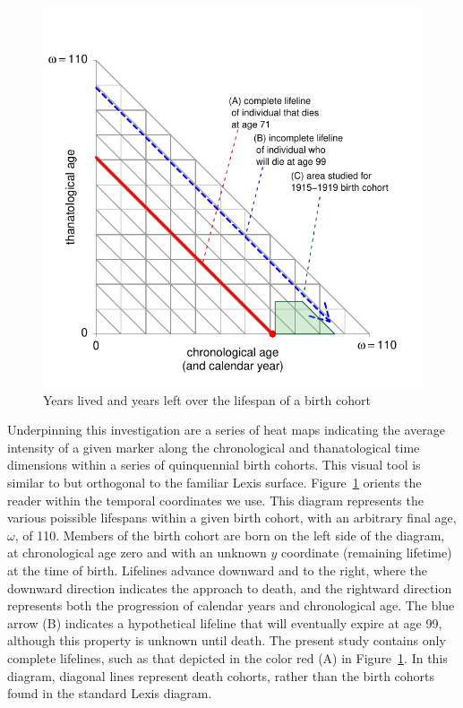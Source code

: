 \documentclass{article}
\begin{document}
\begin{figure}[!h]
\centering
\caption{Years lived and years left over the lifespan of a birth cohort}
\label{fig:LexisOrtho}
	\includegraphics{Figures/LexisOrtho.pdf}
\end{figure}

Underpinning this investigation are a series of heat maps indicating the
average intensity of a given marker along the chronological and thanatological
time dimensions within a series of quinquennial birth cohorts. This visual tool
is similar to but orthogonal to the familiar Lexis surface.
Figure~\ref{fig:LexisOrtho} orients the reader within the temporal coordinates we use. This diagram represents the various poissible lifespans within a given
birth cohort, with an arbitrary final age, $\omega$, of 110.
Members of the birth cohort are born on the left side of the diagram, at
chronological age zero and with an unknown $y$ coordinate (remaining lifetime)
at the time of birth.
Lifelines advance downward and to the right, where the downward direction indicates the approach to death, and the
rightward direction represents both the progression of calendar years and
chronological age. The blue arrow (B) indicates a hypothetical lifeline that
will eventually expire at age 99, although this property is unknown until death. The
present study contains only complete lifelines, such as that depicted in the
color red (A) in Figure~\ref{fig:LexisOrtho}. In this diagram, diagonal lines
represent death cohorts, rather than the birth cohorts found in the standard
Lexis diagram.
\end{document}
